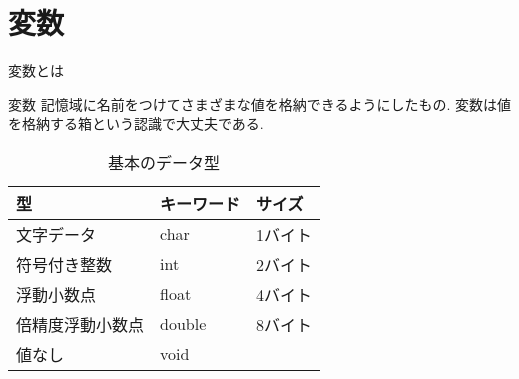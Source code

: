 \documentclass[xdvipdfmx, 8pt, t]{beamer}
\begin{document}
\section{変数}
\begin{frame}{変数とは}
    \begin{block}{変数}
        記憶域に名前をつけてさまざまな値を格納できるようにしたもの.
        変数は値を格納する箱という認識で大丈夫である.
    \end{block}
    \begin{table}[]
        \centering
        \begin{tabular}{|l|l|l|}
            \hline
            型       & キーワード  & サイズ\\
            \hline
            文字データ & char  & 1バイト\\
            符号付き整数 & int  & 2バイト\\
            浮動小数点 & float & 4バイト\\
            倍精度浮動小数点 & double & 8バイト\\
            値なし & void & \\
            \hline
        \end{tabular}
        \caption{基本のデータ型}
        \label{tab:my_label}
    \end{table}
\end{frame}
\end{document}
